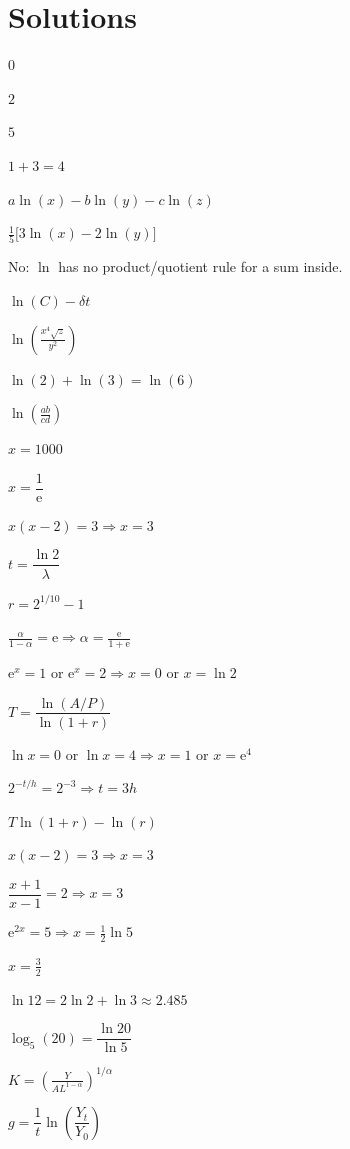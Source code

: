 \section{Solutions}

\begin{solutions}
  \item $0$
  \item $2$
  \item $5$
  \item $1+3=4$
  \item $a\ln(x)-b\ln(y)-c\ln(z)$
  \item $\tfrac15\bigl[3\ln(x)-2\ln(y)\bigr]$
  \item No: $\ln$ has no product/quotient rule for a sum inside.
  \item $\ln(C)-\delta t$
  \item $\displaystyle\ln\left(\frac{x^{4}\sqrt{z}}{y^{2}}\right)$
  \item $\ln(2)+\ln(3)=\ln(6)$
  \item $\displaystyle\ln\left(\frac{ab}{cd}\right)$
  \item $x=1000$
  \item $x=\dfrac{1}{\mathrm{e}}$
  \item $x(x-2)=3\Rightarrow x=3$
  \item $t=\dfrac{\ln 2}{\lambda}$
  \item $r=2^{1/10}-1$
  \item $\displaystyle\frac{\alpha}{1-\alpha}=\mathrm{e}\Rightarrow
        \alpha=\frac{\mathrm{e}}{1+\mathrm{e}}$
  \item $\mathrm{e}^{x}=1$ or $\mathrm{e}^{x}=2\Rightarrow x=0$ or
        $x=\ln 2$
  \item $T=\dfrac{\ln(A/P)}{\ln(1+r)}$
  \item $\ln x=0$ or $\ln x=4\Rightarrow x=1$ or $x=\mathrm{e}^{4}$
  \item $2^{-t/h}=2^{-3}\Rightarrow t=3h$
  \item $T\ln(1+r)-\ln(r)$
  \item $x(x-2)=3\Rightarrow x=3$
  \item $\dfrac{x+1}{x-1}=2\Rightarrow x=3$
  \item $\mathrm{e}^{2x}=5\Rightarrow x=\tfrac12\ln 5$
  \item $x=\tfrac32$
  \item $\ln 12=2\ln 2+\ln 3\approx 2.485$
  \item $\log_{5}(20)=\dfrac{\ln 20}{\ln 5}$
  \item $K=\displaystyle\left(\frac{Y}{AL^{1-\alpha}}\right)^{1/\alpha}$
  \item $g=\dfrac{1}{t}\ln\!\left(\dfrac{Y_{t}}{Y_{0}}\right)$
\end{solutions}
